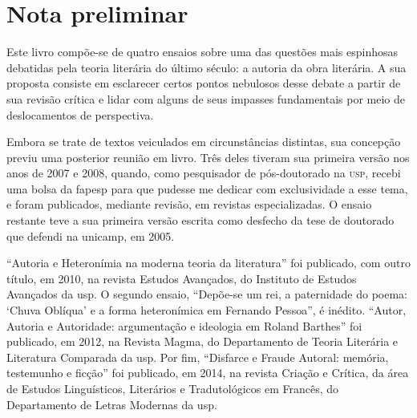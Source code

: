 \chapter*{Nota preliminar}

Este livro compõe-se de quatro ensaios sobre uma das questões mais espinhosas debatidas pela teoria literária do último século: a autoria da obra literária. A sua proposta consiste em esclarecer certos pontos nebulosos desse debate a partir de sua revisão crítica e lidar com alguns de seus impasses fundamentais por meio de deslocamentos de perspectiva.

Embora se trate de textos veiculados em circunstâncias distintas, sua concepção previu uma posterior reunião em livro. Três deles tiveram sua primeira versão nos anos de 2007 e 2008, quando, como pesquisador de pós-doutorado na \textsc{usp}, recebi uma bolsa da fapesp para que pudesse me dedicar com exclusividade a esse tema, e foram publicados, mediante revisão, em revistas especializadas. O ensaio restante teve a sua primeira versão escrita como desfecho da tese de doutorado que defendi na unicamp, em 2005.

“Autoria e Heteronímia na moderna teoria da literatura” foi publicado, com outro título, em 2010, na revista Estudos Avançados, do Instituto de Estudos Avançados da usp. O segundo ensaio, “Depõe-se um rei, a paternidade do poema: ‘Chuva Oblíqua’ e a forma heteronímica em Fernando Pessoa”, é inédito. “Autor, Autoria e Autoridade: argumentação e ideologia em Roland Barthes” foi publicado, em 2012, na Revista Magma, do Departamento de Teoria Literária e Literatura Comparada da usp. Por fim, “Disfarce e Fraude Autoral: memória, testemunho e ficção” foi publicado, em 2014, na revista Criação e Crítica, da área de Estudos Linguísticos, Literários e Tradutológicos em Francês, do Departamento de Letras Modernas da usp. 

